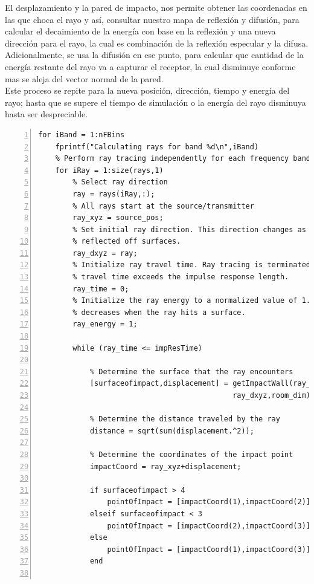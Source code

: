 El desplazamiento y la pared de impacto, nos permite obtener las coordenadas en las que choca el rayo y así, consultar nuestro mapa de reflexión y difusión, para calcular el decaimiento de la energía con base en la reflexión y una nueva dirección para el rayo, la cual es combinación de la reflexión especular y la difusa. \\
Adicionalmente, se usa la difusión en ese punto, para calcular que cantidad de la energía restante del rayo va a capturar el receptor, la cual disminuye conforme mas se aleja del vector normal de la pared. \\
Este proceso se repite para la nueva posición, dirección, tiempo y energía del rayo; hasta que se supere el tiempo de simulación o la energía del rayo disminuya hasta ser despreciable.
\begin{lstlisting}[frame=single,numbers=left, style=Matlab-editor, basicstyle=\tiny]
for iBand = 1:nFBins
    fprintf("Calculating rays for band %d\n",iBand)
    % Perform ray tracing independently for each frequency band.
    for iRay = 1:size(rays,1)
        % Select ray direction
        ray = rays(iRay,:);
        % All rays start at the source/transmitter
        ray_xyz = source_pos;
        % Set initial ray direction. This direction changes as the ray is
        % reflected off surfaces.
        ray_dxyz = ray;
        % Initialize ray travel time. Ray tracing is terminated when the
        % travel time exceeds the impulse response length.
        ray_time = 0;
        % Initialize the ray energy to a normalized value of 1.     Energy
        % decreases when the ray hits a surface.
        ray_energy = 1;

        while (ray_time <= impResTime)

            % Determine the surface that the ray encounters
            [surfaceofimpact,displacement] = getImpactWall(ray_xyz,...
                                             ray_dxyz,room_dim);
            
            % Determine the distance traveled by the ray
            distance = sqrt(sum(displacement.^2));

            % Determine the coordinates of the impact point
            impactCoord = ray_xyz+displacement;

            if surfaceofimpact > 4
                pointOfImpact = [impactCoord(1),impactCoord(2)];
            elseif surfaceofimpact < 3
                pointOfImpact = [impactCoord(2),impactCoord(3)];
            else
                pointOfImpact = [impactCoord(1),impactCoord(3)];
            end


\end{lstlisting}

